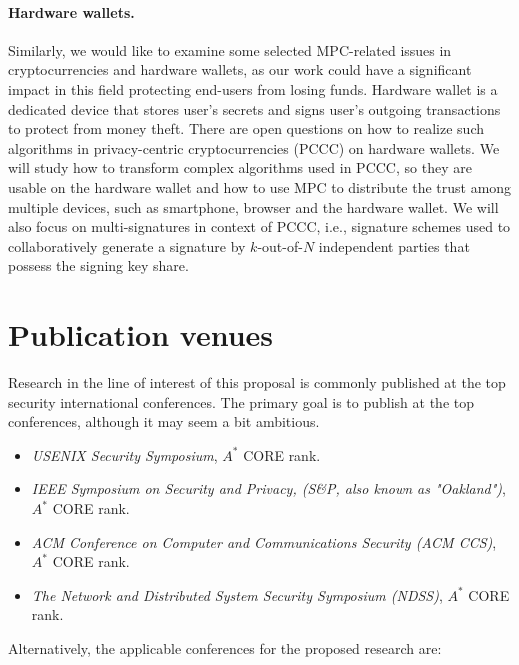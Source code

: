 \documentclass[
  digital, %
  twoside, %
  table,   %
  lof,     %
  lot,     %
]{fithesis3}
\newcounter{ph4_show_guides}
\theoremstyle{definition}
\theoremstyle{remark}
\begin{document}
\paragraph{Hardware wallets.}%
Similarly, we would like to examine some selected MPC-related issues in cryptocurrencies and hardware wallets, as our work could have a significant impact in this field protecting end-users from losing funds. 
Hardware wallet is a dedicated device that stores user's secrets and signs user's outgoing transactions to protect from money theft. There are open questions on how to realize such algorithms in privacy-centric cryptocurrencies (PCCC) on hardware wallets.
We will study how to transform complex algorithms used in PCCC, so they are usable on the hardware wallet and how to use MPC to distribute the trust among multiple devices, such as smartphone, browser and the hardware wallet. We will also focus on multi-signatures in context of PCCC, i.e., signature schemes used to collaboratively generate a signature by $k$-out-of-$N$ independent parties that possess the signing key share.


\section{Publication venues}
Research in the line of interest of this proposal is commonly published at the top security international conferences. The primary goal is to publish at the top conferences, although it may seem a bit ambitious.

\begin{itemize}
	\item \emph{USENIX Security Symposium}, $A^*$ CORE rank.
	
	\item \emph{IEEE Symposium on Security and Privacy, (S\&P, also known as "Oakland")}, $A^*$ CORE rank.
	
	\item \emph{ACM Conference on Computer and Communications Security (ACM CCS)}, $A^*$ CORE rank.
	
	\item \emph{The Network and Distributed System Security Symposium (NDSS)}, $A^*$ CORE rank.
\end{itemize}

Alternatively, the applicable conferences for the proposed research are:
\end{document}
